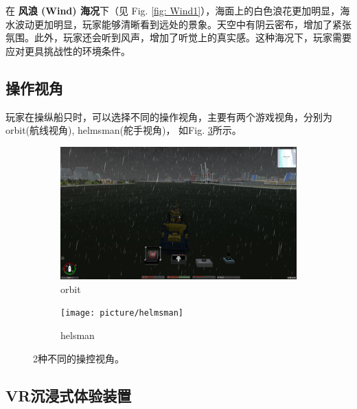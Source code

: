 \documentclass[a4paper,10pt]{article}
\begin{document}
		在 \textbf{风浪 (Wind) 海况}下（见 Fig. \ref{fig: Wind1}），海面上的白色浪花更加明显，海水波动更加明显，玩家能够清晰看到远处的景象。天空中有阴云密布，增加了紧张氛围。此外，玩家还会听到风声，增加了听觉上的真实感。这种海况下，玩家需要应对更具挑战性的环境条件。
		
		\subsection{操作视角}
		
		玩家在操纵船只时，可以选择不同的操作视角，主要有两个游戏视角，分别为 orbit(航线视角), helmsman(舵手视角)， 如Fig. \ref{fig: View}所示。
		
		\begin{figure}[b] 
			\centering 
			
			\begin{subfigure}{0.3\textwidth}
				\includegraphics[width=\linewidth]{picture/orbit}
				\captionsetup{font=scriptsize}
				\caption{orbit}
				\label{fig: orbit}
			\end{subfigure}
			\begin{subfigure}{0.3\textwidth}
				\texttt{[image: picture/helmsman]}
				\captionsetup{font=scriptsize}
				\caption{helsman}
				\label{fig: helmsman}
			\end{subfigure}
			\captionsetup{font=scriptsize}
			\caption{
				\label{fig: View}						
				2种不同的操控视角。
			}
		\end{figure}
		
		\subsection{VR沉浸式体验装置}
		
\end{document}
